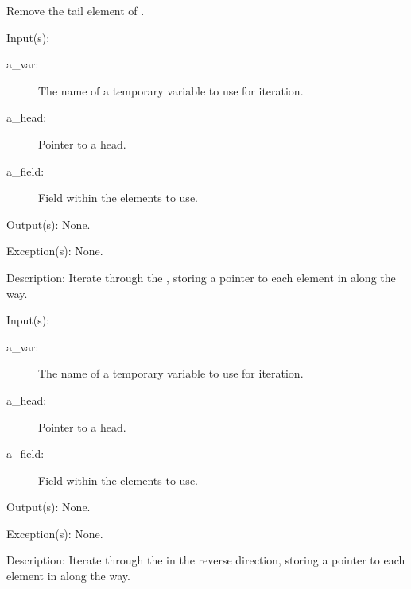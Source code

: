 \begin{capi}
\begin{capilist}
		Remove the tail element of .
	\end{capilist}
\label{ql_foreach}
	\begin{capilist}
	\item[Input(s): ]
		\begin{description}\item[]
		\item[a\_var: ]
			The name of a temporary variable to use for iteration.
		\item[a\_head: ]
			Pointer to a  head.
		\item[a\_field: ]
			Field within the  elements to use.
		\end{description}
	\item[Output(s): ] None.
	\item[Exception(s): ] None.
	\item[Description: ]
		Iterate through the , storing a pointer to each
		element in  along the way.
	\end{capilist}
\label{ql_foreach_reverse}
	\begin{capilist}
	\item[Input(s): ]
		\begin{description}\item[]
		\item[a\_var: ]
			The name of a temporary variable to use for iteration.
		\item[a\_head: ]
			Pointer to a \classname{ql} head.
		\item[a\_field: ]
			Field within the  elements to use.
		\end{description}
	\item[Output(s): ] None.
	\item[Exception(s): ] None.
	\item[Description: ]
		Iterate through the  in the reverse direction,
		storing a pointer to each element in  along the
		way.
	\end{capilist}
\end{capi}
